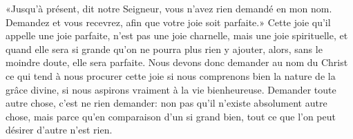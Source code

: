 «Jusqu’à présent, dit notre Seigneur,
	vous n’avez rien demandé en mon nom.
	Demandez et vous recevrez, afin que votre joie soit parfaite.»
Cette joie qu’il appelle une joie parfaite,
	n’est pas une joie charnelle, mais une joie spirituelle,
	et quand elle sera si grande qu’on ne pourra plus rien y ajouter,
	alors, sans le moindre doute, elle sera parfaite.
Nous devons donc demander au nom du Christ
	ce qui tend à nous procurer cette joie
	si nous comprenons bien la nature de la grâce divine,
	si nous aspirons vraiment à la vie bienheureuse.
Demander toute autre chose, c’est ne rien demander:
	non pas qu’il n’existe absolument autre chose,
	mais parce qu’en comparaison d’un si grand bien,
	tout ce que l’on peut désirer d’autre n’est rien.
